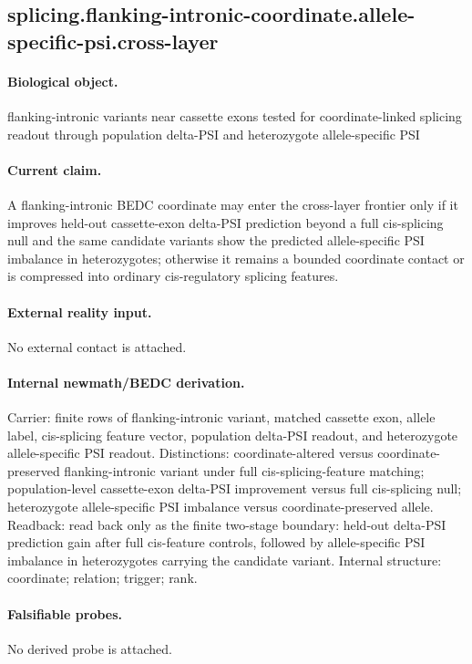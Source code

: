 \subsection{splicing.flanking-intronic-coordinate.allele-specific-psi.cross-layer}

\paragraph{Biological object.} flanking-intronic variants near cassette exons tested for coordinate-linked splicing readout through population delta-PSI and heterozygote allele-specific PSI

\paragraph{Current claim.} A flanking-intronic BEDC coordinate may enter the cross-layer frontier only if it improves held-out cassette-exon delta-PSI prediction beyond a full cis-splicing null and the same candidate variants show the predicted allele-specific PSI imbalance in heterozygotes; otherwise it remains a bounded coordinate contact or is compressed into ordinary cis-regulatory splicing features.

\paragraph{External reality input.}
No external contact is attached.

\paragraph{Internal newmath/BEDC derivation.} Carrier: finite rows of flanking-intronic variant, matched cassette exon, allele label, cis-splicing feature vector, population delta-PSI readout, and heterozygote allele-specific PSI readout. Distinctions: coordinate-altered versus coordinate-preserved flanking-intronic variant under full cis-splicing-feature matching; population-level cassette-exon delta-PSI improvement versus full cis-splicing null; heterozygote allele-specific PSI imbalance versus coordinate-preserved allele. Readback: read back only as the finite two-stage boundary: held-out delta-PSI prediction gain after full cis-feature controls, followed by allele-specific PSI imbalance in heterozygotes carrying the candidate variant. Internal structure: coordinate; relation; trigger; rank.

\paragraph{Falsifiable probes.}
No derived probe is attached.

